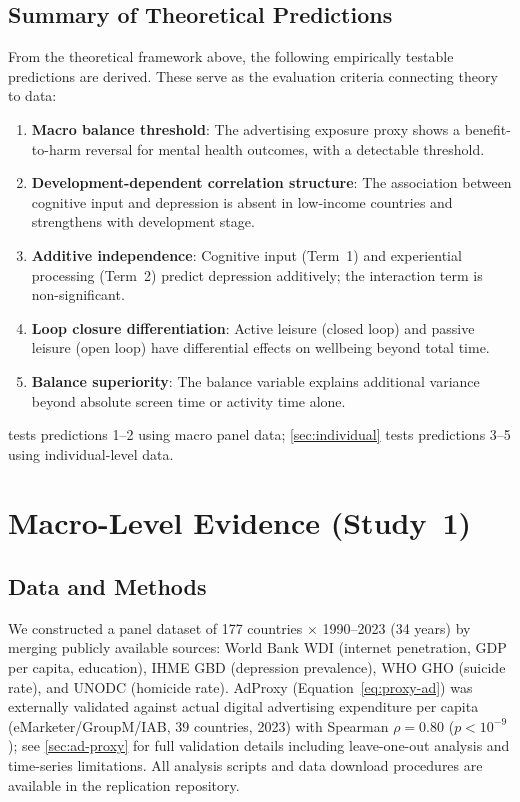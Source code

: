 \documentclass[a4paper,11pt,titlepage]{article}
\begin{document}
\subsection{Summary of Theoretical Predictions}\label{sec:predictions}

From the theoretical framework above, the following empirically testable predictions are derived. These serve as the evaluation criteria connecting theory to data:

\begin{enumerate}
  \item \textbf{Macro balance threshold}: The advertising exposure proxy shows a benefit-to-harm reversal for mental health outcomes, with a detectable threshold.
  \item \textbf{Development-dependent correlation structure}: The association between cognitive input and depression is absent in low-income countries and strengthens with development stage.
  \item \textbf{Additive independence}: Cognitive input (Term~1) and experiential processing (Term~2) predict depression additively; the interaction term is non-significant.
  \item \textbf{Loop closure differentiation}: Active leisure (closed loop) and passive leisure (open loop) have differential effects on wellbeing beyond total time.
  \item \textbf{Balance superiority}: The balance variable explains additional variance beyond absolute screen time or activity time alone.
\end{enumerate}

 tests predictions 1--2 using macro panel data; \cref{sec:individual} tests predictions 3--5 using individual-level data.


\section{Macro-Level Evidence (Study~1)}\label{sec:macro}

\subsection{Data and Methods}\label{sec:data}

We constructed a panel dataset of 177 countries $\times$ 1990--2023 (34 years) by merging publicly available sources: World Bank WDI (internet penetration, GDP per capita, education), IHME GBD (depression prevalence), WHO GHO (suicide rate), and UNODC (homicide rate). AdProxy (Equation~\ref{eq:proxy-ad}) was externally validated against actual digital advertising expenditure per capita (eMarketer/GroupM/IAB, 39 countries, 2023) with Spearman $\rho = 0.80$ ($p < 10^{-9}$); see \cref{sec:ad-proxy} for full validation details including leave-one-out analysis and time-series limitations. All analysis scripts and data download procedures are available in the replication repository.
\end{document}
